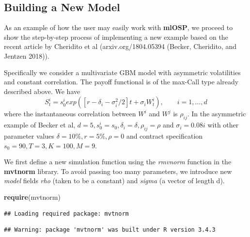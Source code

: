 \documentclass[]{article}
\newenvironment{Shaded}{\begin{snugshade}}{\end{snugshade}}
\newcommand{\KeywordTok}[1]{\textcolor[rgb]{0.13,0.29,0.53}{\textbf{#1}}}
\newcommand{\NormalTok}[1]{#1}
\begin{document}
\subsection{Building a New Model}\label{building-a-new-model}

As an example of how the user may easily work with \textbf{mlOSP}, we
proceed to show the step-by-step process of implementing a new example
based on the recent article by Cheridito et al (arxiv.org/1804.05394
(Becker, Cheridito, and Jentzen 2018)).

Specifically we consider a multivariate GBM model with asymmetric
volatilities and constant correlation. The payoff functional is of the
max-Call type already described above. We have \[ \label{eq:multi-gbm}
S^i_t = s^i_0 exp( [r-\delta_i-\sigma_i^2/2]t + \sigma_i W_t^i), \qquad i=1,\ldots, d
\] where the instantaneous correlation between \(W^i\) and \(W^j\) is
\(\rho_{ij}\). In the asymmetric example of Becker et al,
\(d=5, s^i_0 = s_0, \delta_i = \delta, \rho_{ij} = \rho\) and
\(\sigma_i = 0.08 i\) with other parameter values
\(\delta = 10\%, r = 5\%, \rho = 0\) and contract specification
\(s_0 = 90, T=3, K=100, M=9\).

We first define a new simulation function using the \emph{rmvnorm}
function in the \textbf{mvtnorm} library. To avoid passing too many
parameters, we introduce new \emph{model} fields \emph{rho} (taken to be
a constant) and \emph{sigma} (a vector of length d).

\begin{Shaded}
\begin{Highlighting}[]
\KeywordTok{require}\NormalTok{(mvtnorm)}
\end{Highlighting}
\end{Shaded}

\begin{verbatim}
## Loading required package: mvtnorm
\end{verbatim}

\begin{verbatim}
## Warning: package 'mvtnorm' was built under R version 3.4.3
\end{verbatim}
\end{document}
